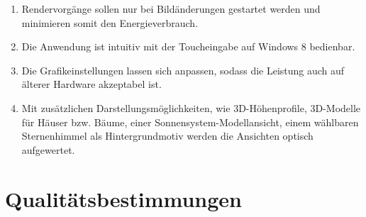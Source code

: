 \documentclass[10pt]{scrreprt}
\newcommand{\ziel}[1]{{\fontsize{9.5}{11}\textsf{/#1/}}}
\newcommand{\ziellabel}{Z}
\newcommand{\wunsch}{\renewcommand{\labelenumi}{\textbf{\ziel{\ziellabel\numprint{\theenumi}0W}}}}
\begin{document}
\begin{enumerate}[leftmargin=2.2cm]
\wunsch
\item Rendervorgänge sollen nur bei Bildänderungen gestartet werden und minimieren somit den Energieverbrauch.
\item Die Anwendung ist intuitiv mit der Toucheingabe auf Windows 8 bedienbar.
\item Die Grafikeinstellungen lassen sich anpassen, sodass die Leistung auch auf älterer Hardware akzeptabel ist.
\item Mit zusätzlichen Darstellungsmöglichkeiten, wie 3D-Höhenprofile, 3D-Modelle für Häuser bzw. Bäume, einer Sonnensystem-Modellansicht, einem wählbaren Sternenhimmel als Hintergrundmotiv werden die Ansichten optisch aufgewertet.
\end{enumerate}



\chapter{Qualitätsbestimmungen}
\end{document}
